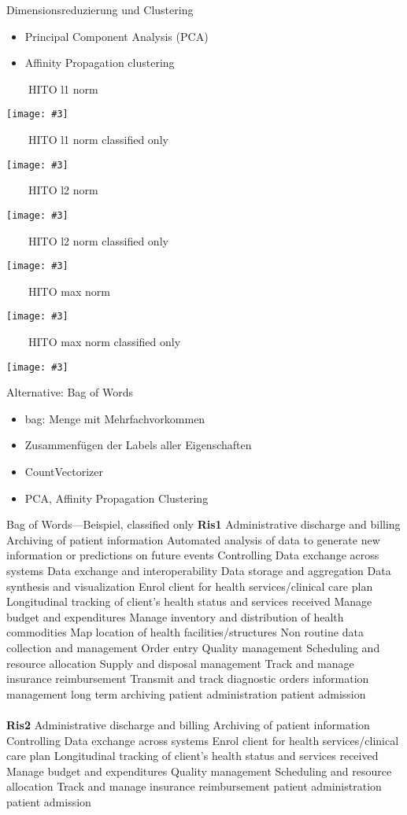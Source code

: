 \documentclass[aspectratio=1610,handout]{beamer}
\newcommand{\imageslide}[4][]
{
\begin{frame}[plain]{~~~~#2}
\vspace{0.2em}
\begin{center}
\centering\texttt{[image: \#3]}
\end{center}
#1
\note{#4}
\end{frame}
}
\begin{document}
\begin{frame}{Dimensionsreduzierung und Clustering}
\begin{itemize}
\item Principal Component Analysis (PCA)
\item Affinity Propagation clustering
\end{itemize}
\end{frame}

\imageslide{HITO l1 norm}{img/cluster-l1.pdf}{}
\imageslide{HITO l1 norm classified only}{img/cluster-classifiedonly-l1.pdf}{}
\imageslide{HITO l2 norm}{img/cluster-l2.pdf}{}
\imageslide{HITO l2 norm classified only}{img/cluster-classifiedonly-l2.pdf}{}
\imageslide{HITO max norm}{img/cluster-max.pdf}{}
\imageslide{HITO max norm classified only}{img/cluster-classifiedonly-max.pdf}{}


\begin{frame}{Alternative: Bag of Words}
\begin{itemize}
\item bag: Menge mit Mehrfachvorkommen
\item Zusammenfügen der Labels aller Eigenschaften
\item CountVectorizer
\item PCA, Affinity Propagation Clustering
\end{itemize}
\end{frame}

\begin{frame}{Bag of Words---Beispiel, classified only}
\small
\textbf{Ris1} Administrative discharge and billing Archiving of patient information Automated analysis of data to generate new information or predictions on future events Controlling Data exchange across systems Data exchange and interoperability Data storage and aggregation Data synthesis and visualization Enrol client for health services/clinical care plan Longitudinal tracking of client’s health status and services received Manage budget and expenditures Manage inventory and distribution of health commodities Map location of health facilities/structures Non routine data collection and management Order entry Quality management Scheduling and resource allocation Supply and disposal management Track and manage insurance reimbursement Transmit and track diagnostic orders information management long term archiving patient administration patient admission
\\~\\
\textbf{Ris2} Administrative discharge and billing Archiving of patient information Controlling Data exchange across systems Enrol client for health services/clinical care plan Longitudinal tracking of client’s health status and services received Manage budget and expenditures Quality management Scheduling and resource allocation Track and manage insurance reimbursement patient administration patient admission
\end{frame}
\end{document}

